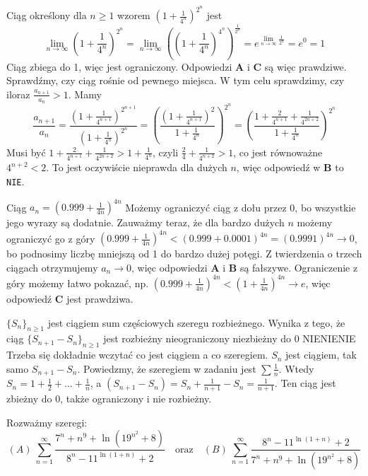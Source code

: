 \begin{solutions}
    \sol Ciąg określony dla $n \geq 1$ wzorem $(1+\frac{1}{4^n})^{2^n}$ jest
    $$
    \lim_{n\to\infty}\left(1+\frac{1}{4^n}\right)^{2^n} = \lim_{n\to\infty}\left(\left(1+\frac{1}{4^n}\right)^{4^n}\right)^\frac{1}{2^n} = e^{\lim_{n\to\infty}\frac{1}{2^n}} = e^0 = 1
    $$
    Ciąg zbiega do 1, więc jest ograniczony. Odpowiedzi \textbf{A} i \textbf{C} są więc prawdziwe. Sprawdźmy, czy ciąg rośnie od pewnego miejsca. W tym celu sprawdzimy, czy iloraz $\frac{a_{n+1}}{a_n}>1$. Mamy
    $$
    \frac{a_{n+1}}{a_n} = \frac{(1+\frac{1}{4^{n+1}})^{2^{n+1}}}{(1+\frac{1}{4^n})^{2^n}} = \left(\frac{(1+\frac{1}{4^{n+1}})^2}{1+\frac{1}{4^n}}\right)^{2^n} = \left(\frac{1+\frac{2}{4^{n+1}}+\frac{1}{4^{2n+2}}}{1+\frac{1}{4^n}}\right)^{2^n}
    $$
    Musi być $1+\frac{2}{4^{n+1}}+\frac{1}{4^{2n+2}}>1+\frac{1}{4^n}$, czyli $\frac{2}{4}+\frac{1}{4^{n+2}}>1$, co jest równoważne $4^{n+2} < 2$. To jest oczywiście nieprawda dla dużych $n$, więc odpowiedź w \textbf{B} to \texttt{NIE}.
    
    \sol Ciąg $a_n = \left(0.999 + \frac{1}{4n}\right)^{4n}$
    Możemy ograniczyć ciąg z dołu przez 0, bo wszystkie jego wyrazy są dodatnie. Zauważmy teraz, że dla bardzo dużych $n$ możemy ograniczyć go z góry $\left(0.999 + \frac{1}{4n}\right)^{4n}<\left(0.999 + 0.0001\right)^{4n}=\left(0.9991\right)^{4n}\to0$, bo podnosimy liczbę mniejszą od 1 do bardzo dużej potęgi. Z twierdzenia o trzech ciągach otrzymujemy $a_n\to0$, więc odpowiedzi \textbf{A} i \textbf{B} są fałszywe. Ograniczenie z góry możemy łatwo pokazać, np. $\left(0.999 + \frac{1}{4n}\right)^{4n} < \left(1 + \frac{1}{4n}\right)^{4n} \to e$, więc odpowiedź \textbf{C} jest prawdziwa.
    
    \sol $\{S_n\}_{n\geq1}$ jest ciągiem sum częściowych szeregu rozbieżnego. Wynika z tego, że ciąg $\{S_{n+1} - S_n\}_{n\geq1}$ jest
    \answerss
    {rozbieżny}
    {nieograniczony}
    {niezbieżny do 0}
    {NIE}{NIE}{NIE}
    Trzeba się dokładnie wczytać co jest ciągiem a co szeregiem. $S_n$ jest ciągiem, tak samo $S_{n+1} - S_n$. Powiedzmy, że szeregiem w zadaniu jest $\sum\frac{1}{n}$. Wtedy $S_n=1+\frac{1}{2} + \dots + \frac{1}{n}$, a $(S_{n+1}-S_n)= S_n + \frac{1}{n+1} - S_n=\frac{1}{n+1}$. Ten ciąg jest zbieżny do $0$, także ograniczony i nie rozbieżny.
    
    \sol Rozważmy szeregi:
    $$
    (A)\ \sum_{n=1}^{\infty}\frac{7^n+n^9+\ln(19^{n^2}+8)}{8^n-11^{\ln(1+n)}+2}\quad\text{oraz}\quad (B)\ \sum_{n=1}^{\infty}\frac{8^n-11^{\ln(1+n)}+2}{7^n+n^9+\ln(19^{n^2}+8)}
    $$
    

\end{solutions}
